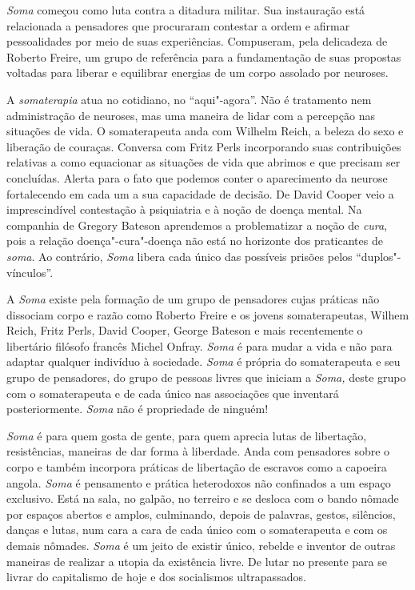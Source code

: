 \emph{Soma} começou como luta contra a ditadura militar. Sua instauração
está relacionada a pensadores que procuraram contestar a ordem e afirmar
pessoalidades por meio de suas experiências. Compuseram, pela delicadeza
de Roberto Freire, um grupo de referência para a fundamentação de suas
propostas voltadas para liberar e equilibrar energias de um corpo
assolado por neuroses.

A \emph{somaterapia} atua no cotidiano, no ``aqui"-agora''. Não é
tratamento nem administração de neuroses, mas uma maneira de lidar com a
percepção nas situações de vida. O somaterapeuta anda com Wilhelm Reich,
a beleza do sexo e liberação de couraças. Conversa com Fritz Perls
incorporando suas contribuições relativas a como equacionar as situações
de vida que abrimos e que precisam ser concluídas. Alerta para o fato
que podemos conter o aparecimento da neurose fortalecendo em cada um a
sua capacidade de decisão. De David Cooper veio a imprescindível
contestação à psiquiatria e à noção de doença mental. Na companhia de
Gregory Bateson aprendemos a problematizar a noção de \emph{cura}, pois
a relação doença"-cura"-doença não está no horizonte dos praticantes de
\emph{soma}. Ao contrário, \emph{Soma} libera cada único das possíveis
prisões pelos ``duplos"-vínculos''.

A \emph{Soma} existe pela formação de um grupo de pensadores cujas
práticas não dissociam corpo e razão como Roberto Freire e os jovens
somaterapeutas, Wilhem Reich, Fritz Perls, David Cooper, George Bateson
e mais recentemente o libertário filósofo francês Michel Onfray.
\emph{Soma} é para mudar a vida e não para adaptar qualquer indivíduo à
sociedade. \emph{Soma} é própria do somaterapeuta e seu grupo de
pensadores, do grupo de pessoas livres que iniciam a \emph{Soma,} deste
grupo com o somaterapeuta e de cada único nas associações que inventará
posteriormente. \emph{Soma} não é propriedade de ninguém!

\emph{Soma} é para quem gosta de gente, para quem aprecia lutas de
libertação, resistências, maneiras de dar forma à liberdade. Anda com
pensadores sobre o corpo e também incorpora práticas de libertação de
escravos como a capoeira angola. \emph{Soma} é pensamento e prática
heterodoxos não confinados a um espaço exclusivo. Está na sala, no
galpão, no terreiro e se desloca com o bando nômade por espaços abertos
e amplos, culminando, depois de palavras, gestos, silêncios, danças e
lutas, num cara a cara de cada único com o somaterapeuta e com os demais
nômades. \emph{Soma} é um jeito de existir único, rebelde e inventor de
outras maneiras de realizar a utopia da existência livre. De lutar no
presente para se livrar do capitalismo de hoje e dos socialismos
ultrapassados.

